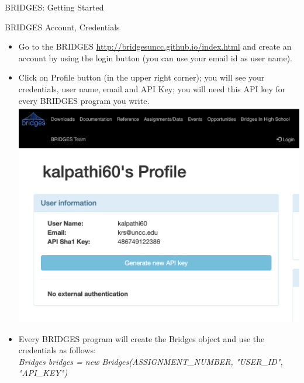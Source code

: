 \documentclass[aspectratio=169]{beamer}
\begin{document}
\begin{frame}{BRIDGES: Getting Started}
\begin{block}{BRIDGES Account, Credentials}
\begin{itemize}
	\item Go to the BRIDGES \href{Home Page}{http://bridgesuncc.github.io/index.html} and create an account by using the login button (you can use your email id as user name).
	\item Click on Profile button (in the upper right corner); you will see 
	your credentials, user name, email and  API Key; you will need this API 
	key for every BRIDGES program you write. 
	{\center
  \includegraphics[width=.6\linewidth]{fig/login.png}
  \includegraphics[width=.3\linewidth]{fig/profile.png}}

	\item Every BRIDGES program will create the Bridges object and use the 
		credentials as follows:\\
	\textsl{Bridges bridges = new Bridges(ASSIGNMENT\_NUMBER, "USER\_ID", "API\_KEY")}
\end{itemize}
\end{block}
\end{frame}
\end{document}
